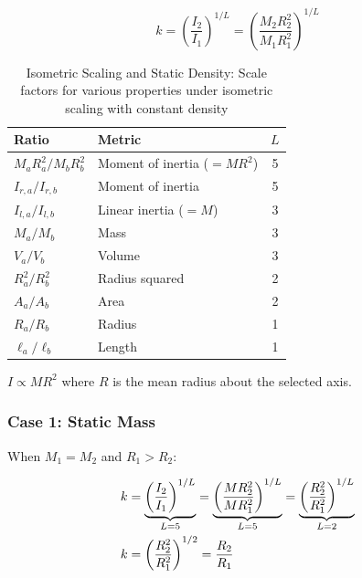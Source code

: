 \documentclass[twoside,twocolumn,9pt]{article}
\begin{document}
\begin{equation}
k = \left(\frac{I_2}{I_1}\right)^{1/L} = \left(\frac{M_2 R_2^2}{M_1 R_1^2}\right)^{1/L}
\end{equation}

\begin{table}[h]
\centering
\caption{Isometric Scaling and Static Density: Scale factors for various properties under isometric scaling with constant density}
\label{tab:scaling_reference}
\begin{tabular}{llc}
\toprule
Ratio & Metric & $L$ \\
\midrule
$M_a R_a^2 / M_b R_b^2$ & Moment of inertia ($=MR^2$) & 5 \\
$I_{r,a}/I_{r,b}$ & Moment of inertia & 5 \\
$I_{l,a}/I_{l,b}$ & Linear inertia ($=M$) & 3 \\
$M_a/M_b$ & Mass & 3 \\
$V_a/V_b$ & Volume & 3 \\
$R_a^2/R_b^2$ & Radius squared & 2 \\
$A_a/A_b$ & Area & 2 \\
$R_a/R_b$ & Radius & 1 \\
$\ell_a/\ell_b$ & Length & 1 \\
\bottomrule
\end{tabular}
\end{table}

$I \propto MR^2$ where $R$ is the mean radius about the selected axis.

\subsubsection*{Case 1: Static Mass}

When $M_1 = M_2$ and $R_1 > R_2$:

\begin{align}
k &= \underbrace{\left(\frac{I_2}{I_1}\right)^{1/L}}_{L=5} = \underbrace{\left(\frac{M R_2^2}{M R_1^2}\right)^{1/L}}_{L=5} = \underbrace{\left(\frac{R_2^2}{R_1^2}\right)^{1/L}}_{L=2} \notag \\
k &= \left(\frac{R_2^2}{R_1^2}\right)^{1/2} = \frac{R_2}{R_1}
\end{align}
\end{document}
